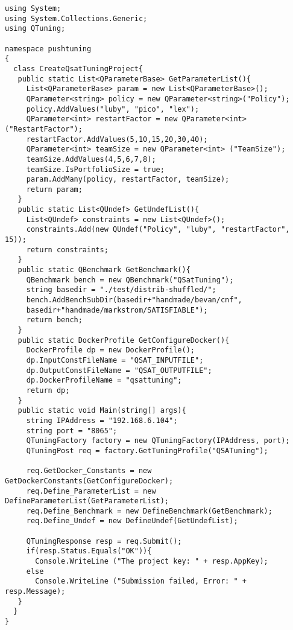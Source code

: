 \documentclass[10pt, conference, compsocconf]{IEEEtran}
\begin{document}
\begin{lstlisting}[caption=Pushing a project in QTuning, label=lst:push]
using System;
using System.Collections.Generic;
using QTuning;

namespace pushtuning
{
  class CreateQsatTuningProject{
   public static List<QParameterBase> GetParameterList(){
     List<QParameterBase> param = new List<QParameterBase>();
     QParameter<string> policy = new QParameter<string>("Policy");
     policy.AddValues("luby", "pico", "lex");
     QParameter<int> restartFactor = new QParameter<int>("RestartFactor");
     restartFactor.AddValues(5,10,15,20,30,40);
     QParameter<int> teamSize = new QParameter<int> ("TeamSize");
     teamSize.AddValues(4,5,6,7,8);
     teamSize.IsPortfolioSize = true;
     param.AddMany(policy, restartFactor, teamSize);
     return param;			
   }
   public static List<QUndef> GetUndefList(){
     List<QUndef> constraints = new List<QUndef>();
     constraints.Add(new QUndef("Policy", "luby", "restartFactor", 15));
     return constraints;		
   }
   public static QBenchmark GetBenchmark(){
     QBenchmark bench = new QBenchmark("QSatTuning");
     string basedir = "./test/distrib-shuffled/";
     bench.AddBenchSubDir(basedir+"handmade/bevan/cnf",
     basedir+"handmade/markstrom/SATISFIABLE");
     return bench;
   }
   public static DockerProfile GetConfigureDocker(){
     DockerProfile dp = new DockerProfile();
     dp.InputConstFileName = "QSAT_INPUTFILE";
     dp.OutputConstFileName = "QSAT_OUTPUTFILE";
     dp.DockerProfileName = "qsattuning";
     return dp;		
   }
   public static void Main(string[] args){
     string IPAddress = "192.168.6.104";		
     string port = "8065";
     QTuningFactory factory = new QTuningFactory(IPAddress, port);	
     QTuningPost req = factory.GetTuningProfile("QSATuning");

     req.GetDocker_Constants = new GetDockerConstants(GetConfigureDocker);
     req.Define_ParameterList = new DefineParameterList(GetParameterList);
     req.Define_Benchmark = new DefineBenchmark(GetBenchmark);
     req.Define_Undef = new DefineUndef(GetUndefList);

     QTuningResponse resp = req.Submit();
     if(resp.Status.Equals("OK")){
       Console.WriteLine ("The project key: " + resp.AppKey);
     else
       Console.WriteLine ("Submission failed, Error: " + resp.Message);
   }
  }
}

\end{lstlisting}
\end{document}

